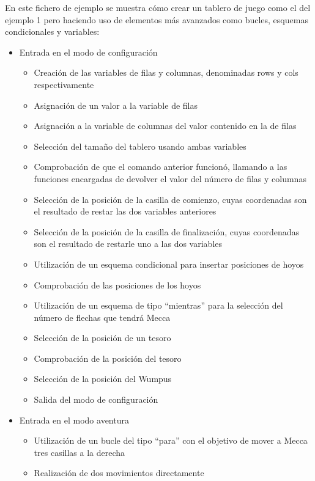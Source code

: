 \documentclass[a4paper,12pt,twoside,openright]{report}
\begin{document}
  En este fichero de ejemplo se muestra cómo crear un tablero de juego como el del ejemplo 1 pero haciendo uso 
  de elementos más avanzados como bucles, esquemas condicionales y variables:
  
  \begin{itemize}
   \item Entrada en el modo de configuración
   \begin{itemize}
    \item Creación de las variables de filas y columnas, denominadas rows y cols respectivamente
    \item Asignación de un valor a la variable de filas
    \item Asignación a la variable de columnas del valor contenido en la de filas
    \item Selección del tamaño del tablero usando ambas variables
    \item Comprobación de que el comando anterior funcionó, llamando a las funciones 
    encargadas de devolver el valor del número de filas y columnas
    \item Selección de la posición de la casilla de comienzo, cuyas coordenadas son el resultado de restar las dos variables anteriores
    \item Selección de la posición de la casilla de finalización, cuyas coordenadas son el resultado de restarle uno a las dos variables
    \item Utilización de un esquema condicional para insertar posiciones de hoyos
    \item Comprobación de las posiciones de los hoyos
    \item Utilización de un esquema de tipo ``mientras'' para la selección del número de flechas que tendrá Mecca
    \item Selección de la posición de un tesoro
    \item Comprobación de la posición del tesoro
    \item Selección de la posición del Wumpus
    \item Salida del modo de configuración
    \end{itemize}
   \item Entrada en el modo aventura
      \begin{itemize}
      \item Utilización de un bucle del tipo ``para'' con el objetivo de mover a Mecca tres casillas a la derecha
      \item Realización de dos movimientos directamente

\end{itemize}
\end{itemize}
\end{document}
